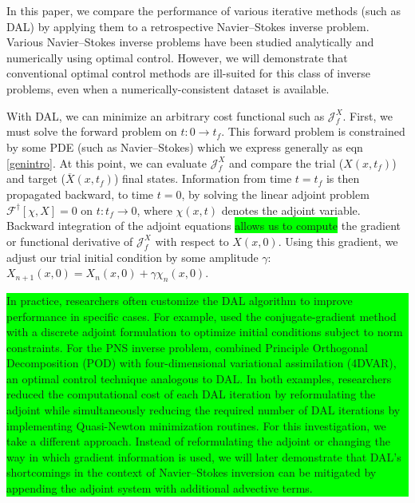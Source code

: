 \documentclass[%
 reprint,
 amsmath,amssymb,
 aps,
 pre,
]{revtex4-2}
\newcommand{\hly}[1]{\colorbox{lime}{\parbox{\columnwidth}{#1}}}
\newcommand{\J}{\mathcal{J}}
\begin{document}
In this paper, we compare the performance of various iterative methods (such as DAL) by applying them to a retrospective Navier--Stokes inverse problem.
Various Navier--Stokes inverse problems have been studied analytically and numerically using optimal control.
However, we will demonstrate that conventional optimal control methods are ill-suited for this class of inverse problems, even when a numerically-consistent dataset is available.

With DAL, we can minimize an arbitrary cost functional such as $\J_f^X$.
First, we must solve the forward problem on $t:0\to t_f$.
This forward problem is constrained by some PDE (such as Navier--Stokes) which we express generally as eqn \ref{genintro}.
At this point, we can evaluate $\J_f^X$ and compare the trial ($X(x, t_f)$) and target ($\overline{X}(x, t_f)$) final states.
Information from time $t=t_f$ is then propagated backward, to time $t=0$, by solving the linear adjoint problem $\mathcal{F}^{\dagger}[\chi, X]=0$ on $t:t_f\to 0$, where $\chi(x,t)$ denotes the adjoint variable.
Backward integration of the adjoint equations \colorbox{lime}{allows us to compute} the gradient or functional derivative of $\J_f^X$ with respect to $X(x, 0)$. 
Using this gradient, we adjust our trial initial condition by some amplitude $\gamma$: $X_{n+1}(x, 0) = X_n(x, 0) + \gamma\chi_n(x, 0)$.


\hspace{-0.45cm}\hly{\hspace{0.5cm} In practice, researchers often customize the DAL algorithm to improve performance in specific cases.
For example, \cite{Mannix2022discrete} used the conjugate-gradient method with a discrete adjoint formulation to optimize initial conditions subject to norm constraints.
For the PNS inverse problem, \cite{Du2013} combined Principle Orthogonal Decomposition (POD) with four-dimensional variational assimilation (4DVAR), an optimal control technique analogous to DAL.
In both examples, researchers reduced the computational cost of each DAL iteration by reformulating the adjoint while simultaneously reducing the required number of DAL iterations by implementing Quasi-Newton minimization routines.
For this investigation, we take a different approach.
Instead of reformulating the adjoint or changing the way in which gradient information is used, we will later demonstrate that DAL's shortcomings in the context of Navier--Stokes inversion can be mitigated by appending the adjoint system with additional advective terms.}
\end{document}
